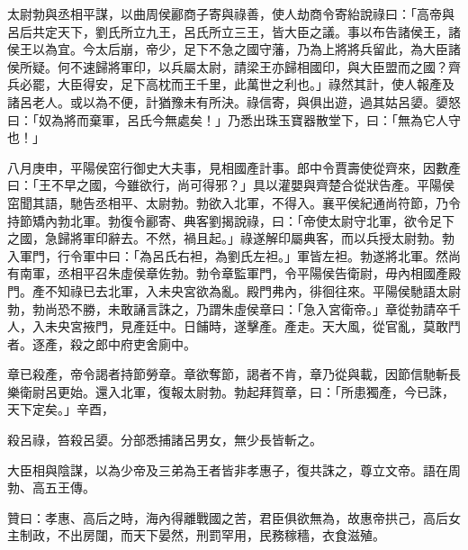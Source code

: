 \begin{pinyinscope}
太尉勃與丞相平謀，以曲周侯酈商子寄與祿善，使人劫商令寄紿說祿曰：「高帝與呂后共定天下，劉氏所立九王，呂氏所立三王，皆大臣之議。事以布告諸侯王，諸侯王以為宜。今太后崩，帝少，足下不急之國守藩，乃為上將將兵留此，為大臣諸侯所疑。何不速歸將軍印，以兵屬太尉，請梁王亦歸相國印，與大臣盟而之國？齊兵必罷，大臣得安，足下高枕而王千里，此萬世之利也。」祿然其計，使人報產及諸呂老人。或以為不便，計猶豫未有所決。祿信寄，與俱出遊，過其姑呂嬃。嬃怒曰：「奴為將而棄軍，呂氏今無處矣！」乃悉出珠玉寶器散堂下，曰：「無為它人守也！」

八月庚申，平陽侯窋行御史大夫事，見相國產計事。郎中令賈壽使從齊來，因數產曰：「王不早之國，今雖欲行，尚可得邪？」具以灌嬰與齊楚合從狀告產。平陽侯窋聞其語，馳告丞相平、太尉勃。勃欲入北軍，不得入。襄平侯紀通尚符節，乃令持節矯內勃北軍。勃復令酈寄、典客劉揭說祿，曰：「帝使太尉守北軍，欲令足下之國，急歸將軍印辭去。不然，禍且起。」祿遂解印屬典客，而以兵授太尉勃。勃入軍門，行令軍中曰：「為呂氏右袒，為劉氏左袒。」軍皆左袒。勃遂將北軍。然尚有南軍，丞相平召朱虛侯章佐勃。勃令章監軍門，令平陽侯告衛尉，毋內相國產殿門。產不知祿已去北軍，入未央宮欲為亂。殿門弗內，徘徊往來。平陽侯馳語太尉勃，勃尚恐不勝，未敢誦言誅之，乃謂朱虛侯章曰：「急入宮衛帝。」章從勃請卒千人，入未央宮掖門，見產廷中。日餔時，遂擊產。產走。天大風，從官亂，莫敢鬥者。逐產，殺之郎中府吏舍廁中。

章已殺產，帝令謁者持節勞章。章欲奪節，謁者不肯，章乃從與載，因節信馳斬長樂衛尉呂更始。還入北軍，復報太尉勃。勃起拜賀章，曰：「所患獨產，今已誅，天下定矣。」辛酉，

殺呂祿，笞殺呂嬃。分部悉捕諸呂男女，無少長皆斬之。

大臣相與陰謀，以為少帝及三弟為王者皆非孝惠子，復共誅之，尊立文帝。語在周勃、高五王傳。

贊曰：孝惠、高后之時，海內得離戰國之苦，君臣俱欲無為，故惠帝拱己，高后女主制政，不出房闥，而天下晏然，刑罰罕用，民務稼穡，衣食滋殖。


\end{pinyinscope}